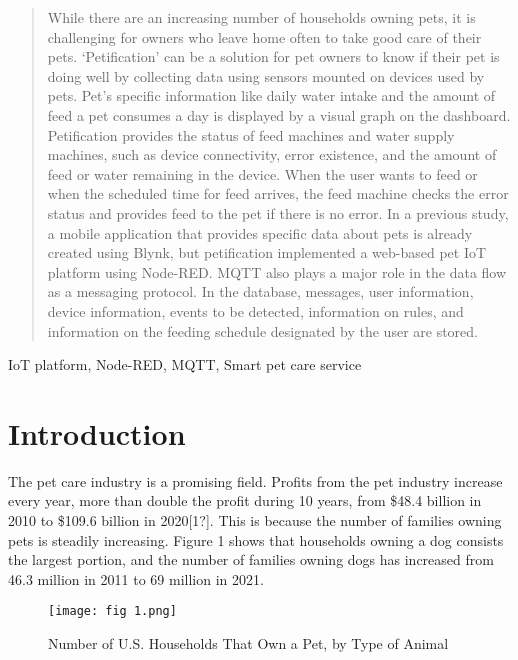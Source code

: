 \documentclass[conference]{IEEEtran}
\begin{document}
\begin{abstract}
While there are an increasing number of households owning pets, it is challenging for owners who leave home often to take good care of their pets. ‘Petification’ can be a solution for pet owners to know if their pet is doing well by collecting data using sensors mounted on devices used by pets. Pet’s specific information like daily water intake and the amount of feed a pet consumes a day is displayed by a visual graph on the dashboard. Petification provides the status of feed machines and water supply machines, such as device connectivity, error existence, and the amount of feed or water remaining in the device. When the user wants to feed or when the scheduled time for feed arrives, the feed machine checks the error status and provides feed to the pet if there is no error. In a previous study, a mobile application that provides specific data about pets is already created using Blynk, but petification implemented a web-based pet IoT platform using Node-RED. MQTT also plays a major role in the data flow as a messaging protocol. In the database, messages, user information, device information, events to be detected, information on rules, and information on the feeding schedule designated by the user are stored.
\end{abstract}
\hfill\break
\begin{IEEEkeywords}
IoT platform, Node-RED, MQTT, Smart pet care service 
\end{IEEEkeywords}
\section{Introduction}
The pet care industry is a promising field. Profits from the pet industry increase every year, more than double the profit during 10 years, from \$48.4 billion in 2010 to \$109.6 billion in 2020[1?]. This is because the number of families owning pets is steadily increasing. Figure 1 shows that households owning a dog consists the largest portion, and the number of families owning dogs has increased from 46.3 million in 2011 to 69 million in 2021.

\begin{figure}[htbp]
\centerline{\texttt{[image: fig 1.png]}}
\caption{Number of U.S. Households That Own a Pet, by Type of Animal
}
\label{fig}
\end{figure}
\end{document}
